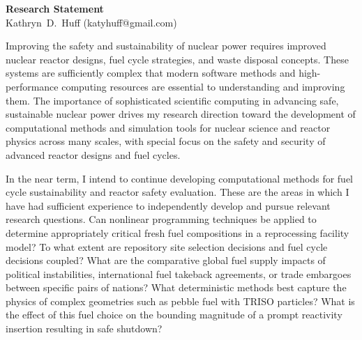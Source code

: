 \documentclass[a4paper, 10pt]{article}
\makeatletter
\newcommand{\authorname}{Kathryn~D.~Huff }
\newcommand{\authoremail}{katyhuff@gmail.com}
\newcommand{\authorsite}{katyhuff.github.com}
\makeatother
\begin{document}
\pagestyle{fancy}
\lhead{\textcolor{gray}{\it \authorname}}
\rhead{\textcolor{gray}{\thepage/\totalpages{}}}
\renewcommand{\headrulewidth}{0pt} 
\renewcommand{\footrulewidth}{0pt} 
\fancyfoot[C]{\footnotesize \textcolor{gray}{\authorsite}} 

\begin{center}
{\LARGE \bf Research Statement}\\
\vspace*{0.1cm}
{\normalsize \authorname (\authoremail)}
\end{center}




Improving the safety and sustainability of nuclear power requires improved 
nuclear reactor designs, fuel cycle strategies, and waste disposal concepts.  
These systems are sufficiently complex that modern software methods and 
high-performance computing resources are essential to understanding and 
improving them. The importance of sophisticated scientific computing in 
advancing safe, sustainable nuclear power drives my research direction toward 
the development of computational methods and simulation tools for nuclear 
science and  reactor physics across many scales, with special focus on the 
safety and security of advanced reactor designs and fuel cycles.

In the near term, I intend to continue developing computational methods for fuel 
cycle sustainability and reactor safety evaluation. These are the areas in which I 
have had sufficient experience to independently develop and pursue relevant 
research questions.  Can nonlinear programming techniques be applied to 
determine appropriately critical fresh fuel compositions in a reprocessing 
facility model? To what extent are repository site selection decisions and fuel 
cycle decisions coupled? What are the comparative global fuel supply impacts of 
political instabilities, international fuel takeback agreements, or
trade embargoes between specific pairs of nations?  What deterministic methods 
best capture the physics of complex geometries such as pebble fuel with TRISO 
particles? What is the effect of this fuel choice on the bounding magnitude of a 
prompt reactivity insertion resulting in safe shutdown? 
\end{document}
